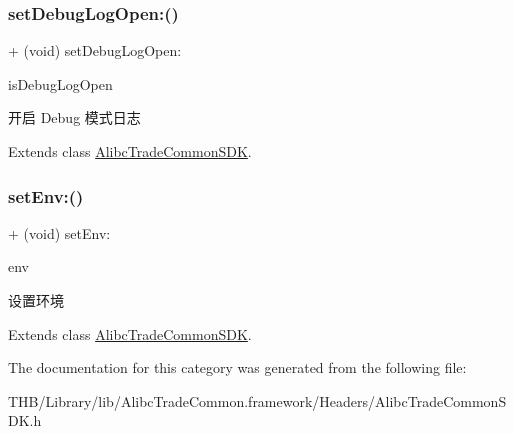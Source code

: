 \mbox{\label{category_alibc_trade_common_s_d_k_07_settings_08_a078b422151a1f58252df135495ca6672}} 
\subsubsection{\texorpdfstring{set\+Debug\+Log\+Open\+:()}{setDebugLogOpen:()}}
{\footnotesize\ttfamily + (void) set\+Debug\+Log\+Open\+: \begin{DoxyParamCaption}\item[{(B\+O\+OL)}]{is\+Debug\+Log\+Open }\end{DoxyParamCaption}}

开启 Debug 模式日志 

Extends class \mbox{\hyperlink{interface_alibc_trade_common_s_d_k_a078b422151a1f58252df135495ca6672}{Alibc\+Trade\+Common\+S\+DK}}.

\mbox{\label{category_alibc_trade_common_s_d_k_07_settings_08_a780956aef5009a4b6fcbe3fc9f63f598}} 
\subsubsection{\texorpdfstring{set\+Env\+:()}{setEnv:()}}
{\footnotesize\ttfamily + (void) set\+Env\+: \begin{DoxyParamCaption}\item[{(Alibc\+Environment)}]{env }\end{DoxyParamCaption}}

设置环境 

Extends class \mbox{\hyperlink{interface_alibc_trade_common_s_d_k_a780956aef5009a4b6fcbe3fc9f63f598}{Alibc\+Trade\+Common\+S\+DK}}.



The documentation for this category was generated from the following file\+:\begin{DoxyCompactItemize}
\item 
T\+H\+B/\+Library/lib/\+Alibc\+Trade\+Common.\+framework/\+Headers/Alibc\+Trade\+Common\+S\+D\+K.\+h\end{DoxyCompactItemize}
